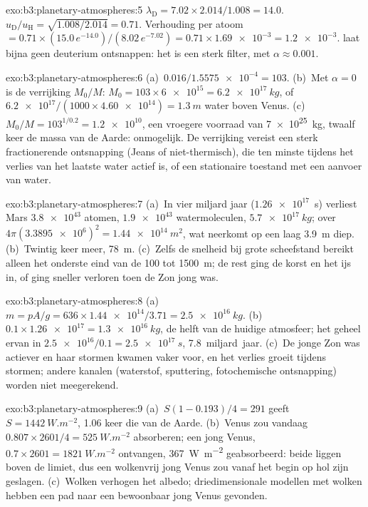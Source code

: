 \begin{solution}{exo:b3:planetary-atmospheres:5}
$\lambda_\mathrm D = 7.02\times2.014/1.008 = 14.0$. $u_\mathrm D/u_\mathrm H
= \sqrt{1.008/2.014} = 0.71$. Verhouding per atoom $= 0.71\times(15.0\,
e^{-14.0})/(8.02\,e^{-7.02}) = 0.71\times\num{1.69e-3} = \num{1.2e-3}$.
 laat bijna geen deuterium ontsnappen: het is een sterk filter, met
$\alpha \approx 0.001$.
\end{solution}

\begin{solution}{exo:b3:planetary-atmospheres:6}
(a)~$0.016/\num{1.5575e-4} = 103$. (b)~Met $\alpha = 0$ is de verrijking
$M_0/M$: $M_0 = 103\times\num{6e15} = \qty{6.2e17}{kg}$, of
$\num{6.2e17}/(1000\times\num{4.60e14}) = \qty{1.3}{m}$ water boven
Venus. (c)~$M_0/M = 103^{1/0.2} = \num{1.2e10}$, een vroegere voorraad van
\qty{7e25}{kg}, twaalf keer de massa van de Aarde: onmogelijk. De
verrijking vereist een sterk fractionerende ontsnapping (Jeans of niet-thermisch),
die ten minste tijdens het verlies van het laatste water actief is, of een
stationaire toestand met een aanvoer van water.
\end{solution}

\begin{solution}{exo:b3:planetary-atmospheres:7}
(a)~In vier miljard jaar ($\num{1.26e17}$~s) verliest Mars
$\num{3.8e43}$ atomen, $\num{1.9e43}$ watermoleculen, $\qty{5.7e17}{kg}$;
over $4\pi(\num{3.3895e6})^2 = \qty{1.44e14}{m^2}$, wat neerkomt op een laag
\qty{3.9}{m} diep. (b)~Twintig keer meer, \qty{78}{m}. (c)~Zelfs de
snelheid bij grote scheefstand bereikt alleen het onderste eind van de 100 tot
\qty{1500}{m}; de rest ging de korst en het ijs in, of ging
sneller verloren toen de Zon jong was.
\end{solution}

\begin{solution}{exo:b3:planetary-atmospheres:8}
(a)~$m = pA/g = 636\times\num{1.44e14}/3.71 = \qty{2.5e16}{kg}$.
(b)~$0.1\times\num{1.26e17} = \qty{1.3e16}{kg}$, de helft van de huidige
atmosfeer; het geheel ervan in $\num{2.5e16}/0.1 = \qty{2.5e17}{s}$,
\num{7.8}~miljard~jaar. (c)~De jonge Zon was actiever en haar
stormen kwamen vaker voor, en het verlies groeit tijdens stormen; andere
kanalen (waterstof, sputtering, fotochemische ontsnapping) worden niet meegerekend.
\end{solution}

\begin{solution}{exo:b3:planetary-atmospheres:9}
(a)~$S(1 - 0.193)/4 = 291$ geeft $S = \qty{1442}{W.m^{-2}}$, 1.06 keer
die van de Aarde. (b)~Venus zou vandaag $0.807\times2601/4 =
\qty{525}{W.m^{-2}}$ absorberen; een jong Venus, $0.7\times2601 = \qty{1821}{W.m^{-2}}$
ontvangen, \qty{367}{W.m^{-2}} geabsorbeerd: beide liggen boven de limiet, dus een
wolkenvrij jong Venus zou vanaf het begin op hol zijn geslagen. (c)~Wolken
verhogen het albedo; driedimensionale modellen met wolken hebben een pad
naar een bewoonbaar jong Venus gevonden.
\end{solution}

